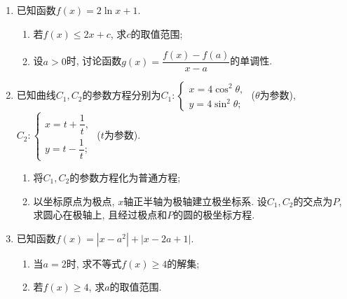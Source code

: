 \begin{description}
\begin{enumerate}[leftmargin=5pt]
        \begin{enumerate}[label=(\arabic*)]
            \item 证明: $AA_1\parallel MN$, 且平面$A_1AMN\perp$平面$EB_1C_1F$;
            \item 设$O$为$\triangle A_1B_1C_1$的中心, 若$AO=AB=6$, $AO\parallel$平面$EB_1C_1F$, 且$\angle MPN=\dfrac{\pi}{3}$, 求四棱锥$B-EB_1C_1F$的体积.
        \end{enumerate}
        
        \item 已知函数$f(x)=2\ln x+1$.
        \begin{enumerate}[label=(\arabic*)]
            \item 若$f(x)\leqslant 2x+c$, 求$c$的取值范围;
            \item 设$a>0$时, 讨论函数$g(x)=\dfrac{f(x)-f(a)}{x-a}$的单调性.
        \end{enumerate}
        
        \item 已知曲线$C_1,C_2$的参数方程分别为$C_1:\begin{cases}x=4\cos^{2}\theta,\\y=4\sin^{2}\theta;\end{cases}$ ($\theta$为参数), $C_2:\begin{cases}x=t+\dfrac{1}{t},\\[6pt]y=t-\dfrac{1}{t};\end{cases}$ ($t$为参数).
        \begin{enumerate}[label=(\arabic*)]
            \item 将$C_1,C_2$的参数方程化为普通方程;
            \item 以坐标原点为极点, $x$轴正半轴为极轴建立极坐标系. 设$C_1,C_2$的交点为$P$, 求圆心在极轴上, 且经过极点和$P$的圆的极坐标方程.
        \end{enumerate}
        
        \item 已知函数$f(x)=|x-a^{2}|+|x-2a+1|$.
        \begin{enumerate}[label=(\arabic*)]
            \item 当$a=2$时, 求不等式$f(x)\geqslant 4$的解集;
            \item 若$f(x)\geqslant 4$, 求$a$的取值范围.
        \end{enumerate}
        
    \end{enumerate}
\end{description}
\clearpage


